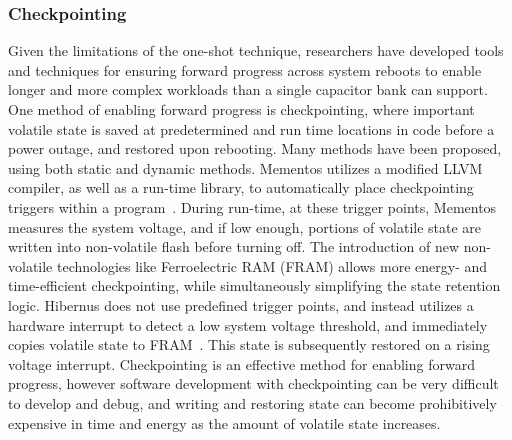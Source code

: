 \subsubsection{Checkpointing}
Given the limitations of the one-shot technique, researchers have developed tools and techniques for
ensuring forward progress across system reboots to enable longer and more complex workloads than a single capacitor bank can support.
One method of enabling forward progress is checkpointing,
where important volatile state is saved at predetermined and run time locations in code before a power outage, and restored upon rebooting. Many methods have been proposed, using both static and dynamic methods.
Mementos utilizes a modified LLVM compiler, as well as a run-time library, to automatically place checkpointing triggers within a program~\cite{ransford2012mementos}. During run-time, at these trigger points, Mementos measures the system voltage, and if low enough, portions of volatile state are written into non-volatile flash before turning off.
The introduction of new non-volatile technologies like Ferroelectric RAM (FRAM) allows more energy- and time-efficient checkpointing, while simultaneously simplifying the state retention logic.
Hibernus does not use predefined trigger points, and instead utilizes a hardware interrupt to detect a low system voltage threshold, and immediately copies volatile state to FRAM~\cite{balsamo2014hibernus}. This state is subsequently restored on a rising voltage interrupt.
Checkpointing is an effective method for enabling forward progress, however software development with checkpointing can be very difficult to develop and debug, and writing and restoring state can become prohibitively expensive in time and energy as the amount of volatile state increases.

